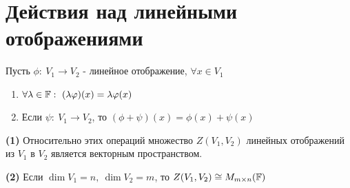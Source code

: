 \section{Действия над линейными отображениями}
    Пусть $\phi: \ V_1 \to V_2$ - линейное отображение, $\forall x \in V_1$ 
    \begin{enumerate}
        \item $\forall \lambda \in \mathbb F: \ (\lambda \varphi)(x) = \lambda \varphi(x)$
        \item Если $\psi: \ V_1 \to V_2$, то $(\phi + \psi)(x) = \phi(x) + \psi(x)$   
    \end{enumerate}
    \begin{subtheorem} \textbf{(1)} 
        Относительно этих операций множество $Z(V_1,V_2)$ линейных отображений из $V_1$ в $V_2$ является векторным пространством.   
    \end{subtheorem}
    \begin{subtheorem} \textbf{(2)}
        Если $\dim V_1 = n, \ \dim V_2 = m$, то $Z(V_1, V_2) \cong M_{m\times n}(\mathbb F)$  
    \end{subtheorem}

